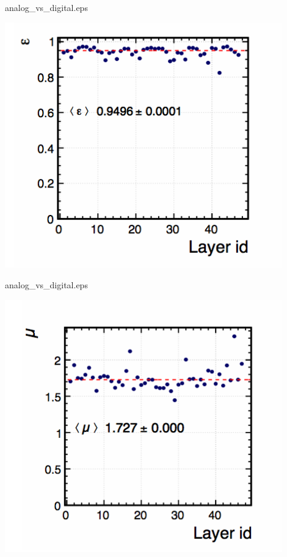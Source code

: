 \begin{frame}{analog\_vs\_digital.eps}
  \centerline{\includegraphics[width=0.9\textwidth]{images/Beam2012Efficiency}}
\end{frame}
\begin{frame}{analog\_vs\_digital.eps}
  \centerline{\includegraphics[width=0.9\textwidth]{images/Beam2012Multiplicity}}
\end{frame}
